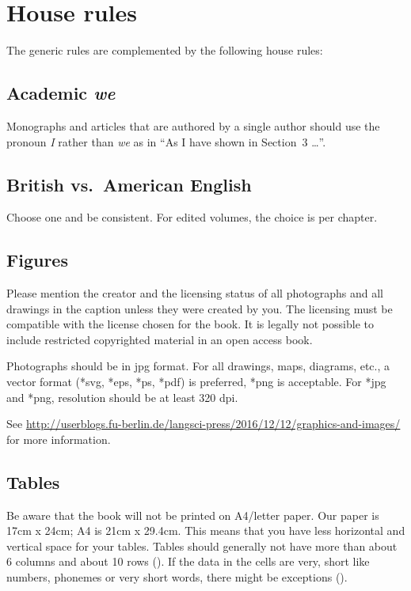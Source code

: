 \section{House rules}\label{sec:houserules}
The generic rules are complemented by the following house rules:

\subsection{Academic \emph{we}}

Monographs and articles that are authored by a single author should use the pronoun \emph{I} rather
than \emph{we} as in ``As I have shown in Section~3 {\dots}''.	
 

\subsection{British vs.\ American English}
Choose one and be consistent. For edited volumes, the choice is per chapter.  


\subsection{Figures}  
Please mention the creator and the licensing status of all photographs and all drawings in the caption unless they were created by you. The licensing must be compatible with the license chosen for the book. It is legally not possible to include restricted copyrighted material in an open access book. 

Photographs should be in jpg format. For all drawings, maps, diagrams, etc., a vector format (*svg, *eps, *ps, *pdf) is preferred, *png is acceptable. For *jpg and *png, resolution should be at least 320 dpi. 

See \url{http://userblogs.fu-berlin.de/langsci-press/2016/12/12/graphics-and-images/} for more information.

\subsection{Tables}
Be aware that the book will not be printed on A4/letter paper. Our paper is 17cm x 24cm; A4 is 21cm x 29.4cm.  This means that you have less horizontal and vertical space for your tables. Tables should generally not have more than about 6 columns and about 10 rows (). If the data in the cells are very, short like numbers, phonemes or very short words, there might be exceptions ().



